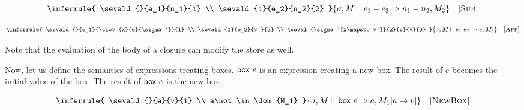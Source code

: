 \vspace{-1em}

\[
  \inferrule
  {
    \sevald{}{e_1}{n_1}{1} \\
    \sevald{1}{e_2}{n_2}{2}
  }
  { \sevald{}{\esub{e_1}{e_2}}{n_1-n_2}{2} }
  \quad\textsc{[Sub]}
\]

\vspace{-1em}


\vspace{-1em}

\[
  \inferrule
  {
    \sevald{}{e_1}{\clov{x}{e}{\sigma'}}{1} \\
    \sevald{1}{e_2}{v'}{2} \\
    \seval{\sigma'[x\mapsto v']}{2}{e}{v}{3}
  }
  { \sevald{}{\eapp{e_1}{e_2}}{v}{3} }
  \quad\textsc{[App]}
\]

Note that the evaluation of the body of a closure can modify the store as well.

Now, let us define the semantics of expressions treating boxes.
$\textsf{box}\ e$ is an expression creating a new box. The result of $e$ becomes the
initial value of the box. The result of $\textsf{box}\ e$ is the new box.


\vspace{-1em}

\[
  \inferrule
  {
    \sevald{}{e}{v}{1} \\
    a\not\in \dom{M_1}
  }
  { \seval{\sigma}{M}{\eref{e}}{a}{M_1[a\mapsto v]} }
  \quad\textsc{[NewBox]}
\]

